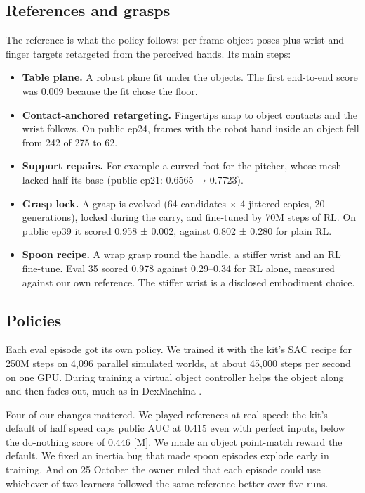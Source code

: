 \documentclass[11pt]{article}
\begin{document}
\subsection{References and grasps}
The reference is what the policy follows: per-frame object poses plus wrist and finger targets retargeted from the perceived hands. Its main steps:

\begin{itemize}[itemsep=2pt,topsep=3pt]
\item \textbf{Table plane.} A robust plane fit under the objects. The first end-to-end score was 0.009 because the fit chose the floor.
\item \textbf{Contact-anchored retargeting.} Fingertips snap to object contacts and the wrist follows. On public ep24, frames with the robot hand inside an object fell from 242 of 275 to 62.
\item \textbf{Support repairs.} For example a curved foot for the pitcher, whose mesh lacked half its base (public ep21: 0.6565 → 0.7723).
\item \textbf{Grasp lock.} A grasp is evolved (64 candidates × 4 jittered copies, 20 generations), locked during the carry, and fine-tuned by 70M steps of RL. On public ep39 it scored 0.958 ± 0.002, against 0.802 ± 0.280 for plain RL.
\item \textbf{Spoon recipe.} A wrap grasp round the handle, a stiffer wrist and an RL fine-tune. Eval 35 scored 0.978 against 0.29–0.34 for RL alone, measured against our own reference. The stiffer wrist is a disclosed embodiment choice.
\end{itemize}
\subsection{Policies}
Each eval episode got its own policy. We trained it with the kit's SAC recipe for 250M steps on 4,096 parallel simulated worlds, at about 45,000 steps per second on one GPU. During training a virtual object controller helps the object along and then fades out, much as in DexMachina \cite{r5}.

Four of our changes mattered. We played references at real speed: the kit's default of half speed caps public AUC at 0.415 even with perfect inputs, below the do-nothing score of 0.446 {[}M{]}. We made an object point-match reward the default. We fixed an inertia bug that made spoon episodes explode early in training. And on 25 October the owner ruled that each episode could use whichever of two learners followed the same reference better over five runs.
\end{document}
